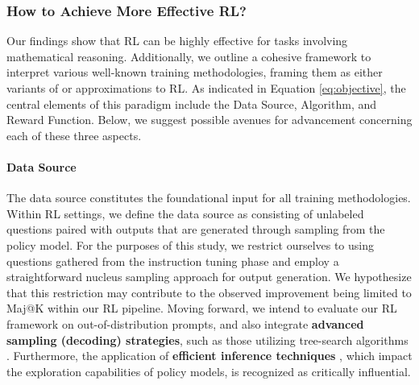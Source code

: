 \begin{itemize}[topsep=0pt]
\begin{itemize}[topsep=0pt]
\subsubsection{How to Achieve More Effective RL?}
\label{sec:effec_rl}
Our findings show that RL can be highly effective for tasks involving mathematical reasoning. Additionally, we outline a cohesive framework to interpret various well-known training methodologies, framing them as either variants of or approximations to RL. As indicated in Equation \ref{eq:objective}, the central elements of this paradigm include the Data Source, Algorithm, and Reward Function. Below, we suggest possible avenues for advancement concerning each of these three aspects.

\paragraph{Data Source} The data source constitutes the foundational input for all training methodologies. Within RL settings, we define the data source as consisting of unlabeled questions paired with outputs that are generated through sampling from the policy model. For the purposes of this study, we restrict ourselves to using questions gathered from the instruction tuning phase and employ a straightforward nucleus sampling approach for output generation. We hypothesize that this restriction may contribute to the observed improvement being limited to Maj@K within our RL pipeline. Moving forward, we intend to evaluate our RL framework on out-of-distribution prompts, and also integrate \textbf{advanced sampling (decoding) strategies}, such as those utilizing tree-search algorithms \citep{yao2023tree}. Furthermore, the application of \textbf{efficient inference techniques} \citep{xia-etal-2023-speculative,leviathan2023fast,kwon2023efficient,xia2024unlocking}, which impact the exploration capabilities of policy models, is recognized as critically influential.


\end{itemize}
\end{itemize}

